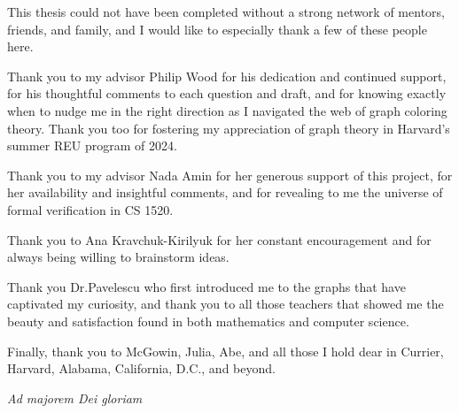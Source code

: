 
This thesis could not have been completed without a strong network of mentors, friends, and family, and I would like to especially thank a few of these people here.

Thank you to my advisor Philip Wood for his dedication and continued support, for his thoughtful comments to each question and draft, and for knowing exactly when to nudge me in the right direction as I navigated the web of graph coloring theory. Thank you too for fostering my appreciation of graph theory in Harvard's summer REU program of 2024.

Thank you to my advisor Nada Amin for her generous support of this project, for her availability and insightful comments, and for revealing to me the universe of formal verification in CS 1520. 

Thank you to Ana Kravchuk-Kirilyuk for her constant encouragement and for always being willing to brainstorm ideas.

Thank you Dr.Pavelescu who first introduced me to the graphs that have captivated my curiosity, and thank you to all those teachers that showed me the beauty and satisfaction found in both mathematics and computer science.

Finally, thank you to McGowin, Julia, Abe, and all those I hold dear in Currier, Harvard, Alabama, California, D.C., and beyond. 
\begin{flushright}
\textit{Ad majorem Dei gloriam }
\end{flushright}
